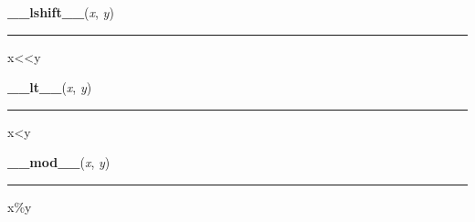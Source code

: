     \label{numpy:ndarray:__lshift__}

    \vspace{0.5ex}

    \begin{boxedminipage}{\textwidth}

    \raggedright \textbf{\_\_lshift\_\_}(\textit{x}, \textit{y})

    \vspace{-1.5ex}

    \rule{\textwidth}{0.5\fboxrule}

x{\textless}{\textless}y
    \vspace{1ex}

    \end{boxedminipage}

    \label{numpy:ndarray:__lt__}

    \vspace{0.5ex}

    \begin{boxedminipage}{\textwidth}

    \raggedright \textbf{\_\_lt\_\_}(\textit{x}, \textit{y})

    \vspace{-1.5ex}

    \rule{\textwidth}{0.5\fboxrule}

x{\textless}y
    \vspace{1ex}

    \end{boxedminipage}

    \label{numpy:ndarray:__mod__}

    \vspace{0.5ex}

    \begin{boxedminipage}{\textwidth}

    \raggedright \textbf{\_\_mod\_\_}(\textit{x}, \textit{y})

    \vspace{-1.5ex}

    \rule{\textwidth}{0.5\fboxrule}

x{\%}y
    \vspace{1ex}

    \end{boxedminipage}

    \label{numpy:ndarray:__mul__}

